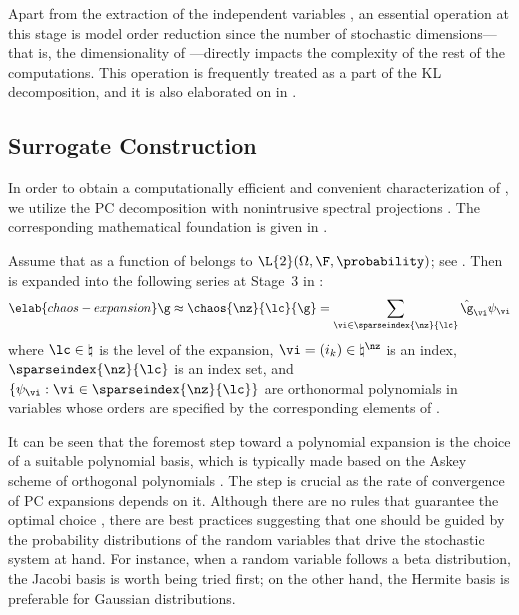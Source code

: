 Apart from the extraction of the independent variables \vz, an essential
operation at this stage is model order reduction since the number of stochastic
dimensions---that is, the dimensionality of \vz---directly impacts the
complexity of the rest of the computations. This operation is frequently treated
as a part of the \ac{KL} decomposition, and it is also elaborated on in
.

\subsection{Surrogate Construction}

In order to obtain a computationally efficient and convenient characterization
of \g, we utilize the \ac{PC} decomposition with nonintrusive spectral
projections \cite{xiu2010}. The corresponding mathematical foundation is given
in .

Assume that \g as a function of \vz belongs to $\L{2}(\Omega, \F,
\probability)$; see . Then \g is expanded into the
following series at Stage~3 in :
\begin{equation} \elab{chaos-expansion}
  \g \approx \chaos{\nz}{\lc}{\g}
  = \sum_{\vi \in \sparseindex{\nz}{\lc}} \hat{\g}_{\vi} \psi_{\vi}
\end{equation}
where $\lc \in \natural$ is the level of the expansion, $\vi = (i_k) \in
\natural^\nz$ is an index, $\sparseindex{\nz}{\lc}$ is an index set, and $\{
\psi_{\vi}: \vi \in \sparseindex{\nz}{\lc} \}$ are orthonormal polynomials in
\nz variables whose orders are specified by the corresponding elements of \vi.

It can be seen that the foremost step toward a polynomial expansion is the
choice of a suitable polynomial basis, which is typically made based on the
Askey scheme of orthogonal polynomials \cite{xiu2010}. The step is crucial as
the rate of convergence of \ac{PC} expansions depends on it. Although there are
no rules that guarantee the optimal choice \cite{knio2006}, there are best
practices suggesting that one should be guided by the probability distributions
of the random variables that drive the stochastic system at hand. For instance,
when a random variable follows a beta distribution, the Jacobi basis is worth
being tried first; on the other hand, the Hermite basis is preferable for
Gaussian distributions.

